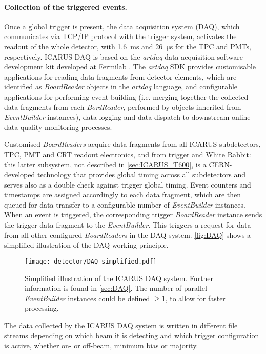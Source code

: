 \paragraph{Collection of the triggered events. } Once a global trigger is present, the data acquisition system (DAQ), which communicates via TCP/IP protocol with the trigger system, activates the readout of the whole detector, with \SI{1.6}{\ms} and \SI{26}{\us} for the TPC and PMTs, respectively. ICARUS DAQ is based on the \emph{artdaq} data acquisition software development kit developed at Fermilab \cite{Biery:2013cda}. The \emph{artdaq} SDK provides  customisable applications for reading data fragments from detector elements, which are identified as \emph{BoardReader} objects in the \emph{artdaq} language, and configurable applications for performing event-building (i.e. merging together the collected data fragments from each \emph{BordReader}, performed by objects inherited from \emph{EventBuilder} instances), data-logging and data-dispatch to downstream online data quality monitoring processes. 

Customised \emph{BoardReaders} acquire data fragments from all ICARUS subdetectors, TPC, PMT and CRT readout electronics, and from trigger and White Rabbit: this latter subsystem, not described in \autoref{sec:ICARUS_T600}, is a CERN-developed technology that provides global timing across all subdetectors and serves also as a double check against trigger global timing. Event counters and timestamps are assigned accordingly to each data fragment, which are then queued for data transfer to a configurable number of \emph{EventBuilder} instances. When an event is triggered, the corresponding trigger \emph{BoardReader} instance sends the trigger data fragment to the \emph{EventBuilder}. This triggers a request for data from all other configured \emph{BoardReader}s in the DAQ system. \autoref{fig:DAQ} shows a simplified illustration of the DAQ working principle. 

\begin{figure}
    \centering
    \texttt{[image: detector/DAQ\_simplified.pdf]}
    \caption[ICARUS DAQ illustration]{Simplified illustration of the ICARUS DAQ system. Further information is found in \autoref{sec:DAQ}. The number of parallel \emph{EventBuilder} instances could be defined $\geq1$, to allow for faster processing.}
    \label{fig:DAQ}
\end{figure}

The data collected by the ICARUS DAQ system is written in different file streams depending on which beam it is detecting and which trigger configuration is active, whether on- or off-beam, minimum bias or majority. 

